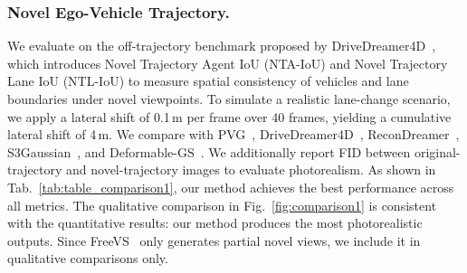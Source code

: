 \documentclass[runningheads]{llncs}
\begin{document}
\subsubsection{Novel Ego-Vehicle Trajectory.}
We evaluate on the off-trajectory benchmark proposed by DriveDreamer4D~\cite{zhao2024drive}, which introduces Novel Trajectory Agent IoU (NTA-IoU) and Novel Trajectory Lane IoU (NTL-IoU) to measure spatial consistency of vehicles and lane boundaries under novel viewpoints. To simulate a realistic lane-change scenario, we apply a lateral shift of 0.1\,m per frame over 40 frames, yielding a cumulative lateral shift of 4\,m. We compare with PVG~\cite{chen2026periodic}, DriveDreamer4D~\cite{zhao2024drive}, ReconDreamer~\cite{ni2025recondreamer}, S3Gaussian~\cite{huang2024s3gaussian}, and Deformable-GS~\cite{yang2023deformable3dgs}. We additionally report FID between original-trajectory and novel-trajectory images to evaluate photorealism. As shown in Tab.~\ref{tab:table_comparison1}, our method achieves the best performance across all metrics. The qualitative comparison in Fig.~\ref{fig:comparison1} is consistent with the quantitative results: our method produces the most photorealistic outputs. Since FreeVS~\cite{wang2024freevs} only generates partial novel views, we include it in qualitative comparisons only.





    
\end{document}
